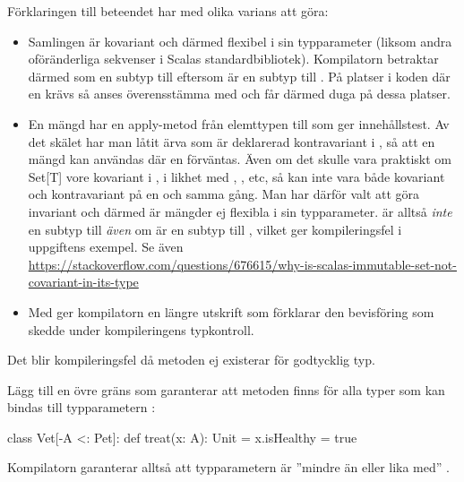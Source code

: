 \SubtaskSolved Förklaringen till beteendet har med olika varians att göra:
\begin{itemize}
  \item Samlingen  är kovariant och därmed flexibel i sin typparameter (liksom andra oföränderliga sekvenser i Scalas standardbibliotek). Kompilatorn betraktar därmed  som en subtyp till  eftersom  är en subtyp till . På platser i koden där en  krävs så anses  överensstämma med   och får därmed duga på dessa platser.
  \item En mängd har en apply-metod från elemttypen till  som ger innehållstest. Av det skälet har man låtit  ärva  som är deklarerad kontravariant i , så att en mängd kan användas där en  förväntas. Även om det skulle vara praktiskt om Set[T] vore kovariant i , i likhet med , ,  etc, så kan inte  vara både kovariant och kontravariant på en och samma gång. Man har därför valt att göra  invariant och därmed är mängder ej flexibla i sin typparameter.  är alltså \emph{inte} en subtyp till  \emph{även} om  är en subtyp till , vilket ger kompileringsfel i uppgiftens exempel. 
  Se även \url{https://stackoverflow.com/questions/676615/why-is-scalas-immutable-set-not-covariant-in-its-type}  
  \item Med  ger kompilatorn en längre utskrift som förklarar den bevisföring som skedde under kompileringens typkontroll.
\end{itemize}



\SubtaskSolved Det blir kompileringsfel då metoden  ej existerar för godtycklig typ.

\SubtaskSolved Lägg till en övre gräns som garanterar att metoden  finns för alla typer som kan bindas till typparametern :
\begin{Code}
class Vet[-A <: Pet]:
  def treat(x: A): Unit = x.isHealthy = true
\end{Code}
Kompilatorn garanterar alltså att typparametern  är ''mindre än eller lika med'' .

